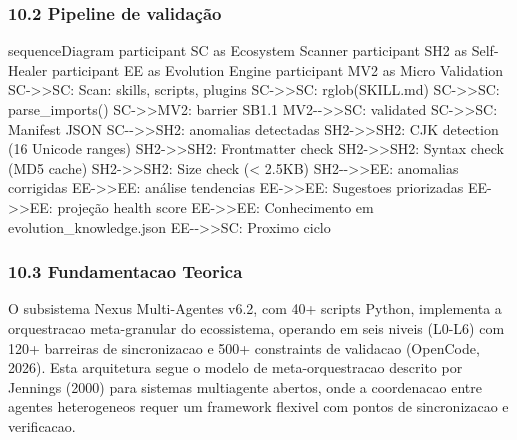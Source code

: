 \documentclass[
  12pt,
]{article}
\newenvironment{Shaded}{}{}
\newcommand{\NormalTok}[1]{#1}
\begin{document}
\subsubsection{10.2 Pipeline de
validação}\label{pipeline-de-validauxe7uxe3o}

\begin{Shaded}
\begin{Highlighting}[]
\NormalTok{sequenceDiagram}
\NormalTok{participant SC as Ecosystem Scanner}
\NormalTok{participant SH2 as Self{-}Healer}
\NormalTok{participant EE as Evolution Engine}
\NormalTok{participant MV2 as Micro Validation}
\NormalTok{SC{-}\textgreater{}\textgreater{}SC: Scan: skills, scripts, plugins}
\NormalTok{SC{-}\textgreater{}\textgreater{}SC: rglob(SKILL.md)}
\NormalTok{SC{-}\textgreater{}\textgreater{}SC: parse\_imports()}
\NormalTok{SC{-}\textgreater{}\textgreater{}MV2: barrier SB1.1}
\NormalTok{MV2{-}{-}\textgreater{}\textgreater{}SC: validated}
\NormalTok{SC{-}\textgreater{}\textgreater{}SC: Manifest JSON}
\NormalTok{SC{-}{-}\textgreater{}\textgreater{}SH2: anomalias detectadas}
\NormalTok{SH2{-}\textgreater{}\textgreater{}SH2: CJK detection (16 Unicode ranges)}
\NormalTok{SH2{-}\textgreater{}\textgreater{}SH2: Frontmatter check}
\NormalTok{SH2{-}\textgreater{}\textgreater{}SH2: Syntax check (MD5 cache)}
\NormalTok{SH2{-}\textgreater{}\textgreater{}SH2: Size check (\textless{} 2.5KB)}
\NormalTok{SH2{-}{-}\textgreater{}\textgreater{}EE: anomalias corrigidas}
\NormalTok{EE{-}\textgreater{}\textgreater{}EE: análise tendencias}
\NormalTok{EE{-}\textgreater{}\textgreater{}EE: Sugestoes priorizadas}
\NormalTok{EE{-}\textgreater{}\textgreater{}EE: projeção health score}
\NormalTok{EE{-}\textgreater{}\textgreater{}EE: Conhecimento em evolution\_knowledge.json}
\NormalTok{EE{-}{-}\textgreater{}\textgreater{}SC: Proximo ciclo}
\end{Highlighting}
\end{Shaded}

\subsubsection{10.3 Fundamentacao
Teorica}\label{fundamentacao-teorica-9}

O subsistema Nexus Multi-Agentes v6.2, com 40+ scripts Python,
implementa a orquestracao meta-granular do ecossistema, operando em seis
niveis (L0-L6) com 120+ barreiras de sincronizacao e 500+ constraints de
validacao (OpenCode, 2026). Esta arquitetura segue o modelo de
meta-orquestracao descrito por Jennings (2000) para sistemas multiagente
abertos, onde a coordenacao entre agentes heterogeneos requer um
framework flexivel com pontos de sincronizacao e verificacao.
\end{document}
